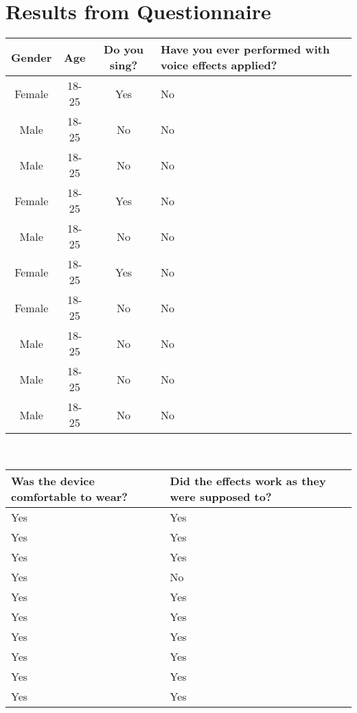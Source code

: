 \section{Results from Questionnaire}\label{QResults}
\begin{center}

\begin{tabular}{| c | c | c | p{5cm} | }
\hline
Gender & Age & Do you sing? & Have you ever performed with voice effects applied? \\ \hline
Female & 18-25 & Yes & No \\ \hline
Male & 18-25 & No & No \\ \hline
Male & 18-25 & No & No \\ \hline
Female & 18-25 & Yes & No \\ \hline
Male & 18-25 & No & No \\ \hline
Female & 18-25 & Yes & No \\ \hline
Female & 18-25 & No & No \\ \hline
Male & 18-25 & No & No \\ \hline
Male & 18-25 & No & No \\ \hline
Male & 18-25 & No & No \\ \hline
\end{tabular}\\

\begin{tabular}{| p{5cm} |  p{5cm} |}
\hline
Was the device comfortable to wear? & Did the effects work as they were supposed to?  \\ \hline
Yes & Yes   \\ \hline
Yes & Yes  \\ \hline
Yes & Yes\\ \hline
Yes & No  \\ \hline
Yes & Yes \\ \hline
Yes & Yes  \\ \hline
Yes & Yes  \\ \hline
Yes & Yes  \\ \hline
Yes & Yes  \\ \hline
Yes & Yes \\ \hline
\end{tabular}\\


\end{center}
